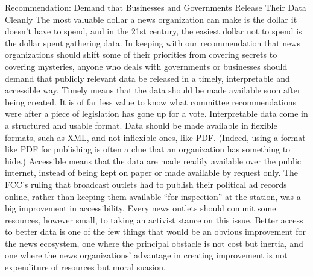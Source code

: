Recommendation: Demand that Businesses and Governments Release
Their Data Cleanly
The most valuable dollar a news organization can make is the dollar it
doesn’t have to spend, and in the 21st century, the easiest dollar not to
spend is the dollar spent gathering data. In keeping with our recommendation
that news organizations should shift some of their priorities
from covering secrets to covering mysteries, anyone who deals with
governments or businesses should demand that publicly relevant data
be released in a timely, interpretable and accessible way.
Timely means that the data should be made available soon after being
created. It is of far less value to know what committee recommendations
were after a piece of legislation has gone up for a vote. Interpretable
data come in a structured and usable format. Data should be made
available in flexible formats, such as XML, and not inflexible ones, like
PDF. (Indeed, using a format like PDF for publishing is often a clue
that an organization has something to hide.) Accessible means that the
data are made readily available over the public internet, instead of being
kept on paper or made available by request only. The FCC’s ruling that
broadcast outlets had to publish their political ad records online, rather
than keeping them available ``for inspection'' at the station, was a big
improvement in accessibility.
Every news outlets should commit some resources, however small, to
taking an activist stance on this issue. Better access to better data is one
of the few things that would be an obvious improvement for the news
ecosystem, one where the principal obstacle is not cost but inertia, and
one where the news organizations’ advantage in creating improvement
is not expenditure of resources but moral suasion.

